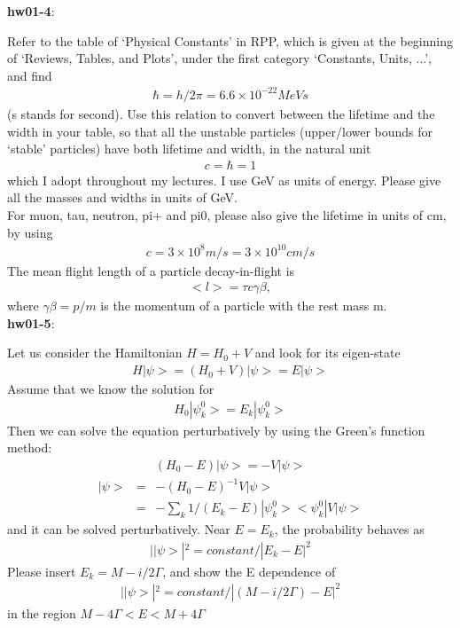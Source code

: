 {\bf hw01-4}:

  Refer to the table of `Physical Constants' in RPP, which is
  given at the beginning of `Reviews, Tables, and Plots',
  under the first category `Constants, Units, ...', and find
  \begin{eqnarray}
  \hbar = h/2\pi
          = 6.6 \times 10^{-22} MeV s
  \end{eqnarray}
  (s stands for second).  Use this relation to convert between
  the lifetime and the width in your table, so that all the
  unstable particles (upper/lower bounds for `stable' particles)
  have both lifetime and width, in the natural unit
  \begin{eqnarray}
  c = \hbar = 1
  \end{eqnarray}
  which I adopt throughout my lectures.  I use GeV as units
  of energy.  Please give all the masses and widths in units
  of GeV.\\

  For muon, tau, neutron, pi+ and pi0, please also give the
  lifetime in units of cm, by using
  \begin{eqnarray}
  c = 3 \times 10^8 m/s = 3 \times 10^{10} cm/s
  \end{eqnarray}
  The mean flight length of a particle decay-in-flight is
  \begin{eqnarray}
  <l> = \tau c \gamma \beta,
  \end{eqnarray}
  where $\gamma \beta = p/m$ is the momentum of a particle with the rest mass m.\\

{\bf hw01-5}:

  Let us consider the Hamiltonian $H = H_0 + V$
  and look for its eigen-state
  \begin{eqnarray}
  H |\psi> = (H_0 + V) |\psi> = E |\psi>
  \end{eqnarray}
  Assume that we know the solution for
  \begin{eqnarray}
  H_0 |\psi^0_k> = E_k |\psi^0_k>
  \end{eqnarray}
  Then we can solve the equation perturbatively by using
  the Green's function method:
  \begin{eqnarray}
  (H_0 - E)|\psi> = -V |\psi>
  \end{eqnarray}
  \begin{eqnarray}
  |\psi> &=& -(H_0 - E)^{-1} V |\psi> \nonumber \\
        &=& - \sum_k 1/(E_k - E) |\psi^0_k><\psi^0_k| V |\psi>
  \end{eqnarray}
  and it can be solved perturbatively.
  Near $E = E_k$, the probability behaves as
  \begin{eqnarray}
  ||\psi>|^2 = constant/|E_k - E|^2
  \end{eqnarray}
  Please insert $E_k = M - i/2 \Gamma$, and show the
  E dependence of
  \begin{eqnarray}
  ||\psi>|^2 = constant/|(M - i/2 \Gamma) - E|^2
  \end{eqnarray}
  in the region $M - 4\Gamma < E < M + 4\Gamma$

